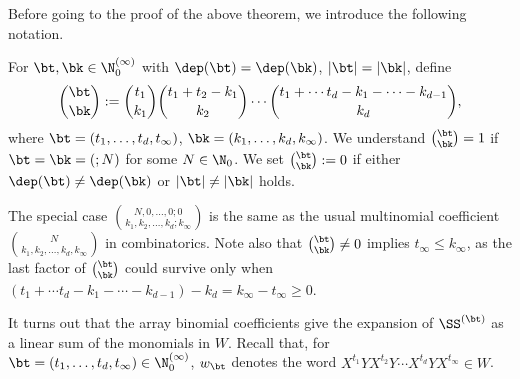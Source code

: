Before going to the proof of the above theorem, we introduce the following
notation.

\begin{Definition}
For $\bt,\bk\in  \N_0^{(\infty)}$ with $\dep(\bt)=\dep(\bk)$, 
$|\bt|=|\bk|$, define
\begin{equation} \label{ArrayBino}
\binom{\bt}{\bk}:=
\binom{t_1}{k_1}
\binom{t_1+t_2-k_1}{k_2}
\cdots
\binom{t_1+\cdots t_d-k_1-\cdots-k_{d-1}}{k_d},
\end{equation}
where $\bt=(t_1,\dots,t_d,t_\infty)$,
$\bk=(k_1,\dots,k_d,k_\infty)$.
We understand $\binom{\bt}{\bk}=1$ if
$\bt=\bk=(;N)$ for some $N\in \N_0$.
We set $\binom{\bt}{\bk}:=0$ if either $\dep(\bt)\ne\dep(\bk)$ or 
$|\bt|\ne|\bk|$ holds.
\end{Definition}

\begin{Remark} 
\label{rem2.6}
The special case $\binom{N,0,\dots,0;0}{k_1,k_2,\dots,k_d;k_\infty}$ 
is the same as the usual multinomial coefficient 
$\binom{N}{k_1,k_2,\dots,k_d,k_\infty}$ in combinatorics.
Note also that $\binom{\bt}{\bk}\ne 0$ implies $t_\infty\le k_\infty$,
as the last factor of $\binom{\bt}{\bk}$ could survive only when 
$(t_1+\cdots t_d-k_1-\cdots-k_{d-1})-k_d=k_\infty-t_\infty\ge 0$.
\end{Remark}

It turns out that the array binomial coefficients give
the expansion of $\SS^{(\bt)}$ as a linear sum of the monomials in $W$.
Recall that, for $\bt=(t_1,\dots,t_d,t_\infty)\in  \N_0^{(\infty)}$, 
$w_\bt$ denotes the word $X^{t_1}YX^{t_2}Y\cdots X^{t_d}YX^{t_\infty}\in W$.




